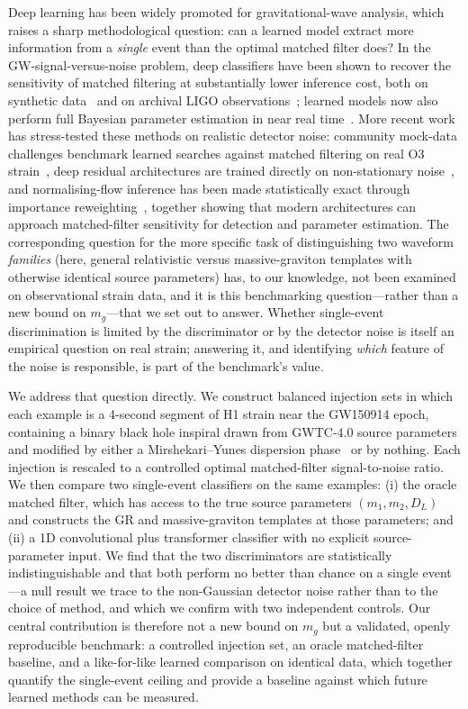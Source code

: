 \documentclass[11pt,a4paper]{article}
\newcommand{\mg}{m_{g}}
\begin{document}
Deep learning has been widely promoted for gravitational-wave analysis,
which raises a sharp methodological question: can a learned model extract
more information from a \emph{single} event than the optimal matched
filter does? In the GW-signal-versus-noise problem, deep classifiers have
been shown to recover the sensitivity of matched filtering at
substantially lower inference
cost, both on synthetic data~\cite{Gabbard2018,GeorgeHuerta2018}
and on archival LIGO observations~\cite{Cuoco2021}; learned models now
also perform full Bayesian parameter estimation in near real
time~\cite{Dax2021}. More recent work has stress-tested these methods on
realistic detector noise: community mock-data challenges benchmark learned
searches against matched filtering on real O3 strain~\cite{Schaefer2023_MLGWSC},
deep residual architectures are trained directly on non-stationary
noise~\cite{Nousi2023_ResNet}, and normalising-flow inference has been made
statistically exact through importance reweighting~\cite{Dax2023_NIS},
together showing that modern architectures can approach matched-filter
sensitivity for detection and parameter estimation. The corresponding
question for the more specific task of distinguishing two waveform
\emph{families} (here, general relativistic versus massive-graviton
templates with otherwise identical source parameters) has, to our
knowledge, not been examined on observational strain data, and it is this
benchmarking question---rather than a new bound on $\mg$---that we set
out to answer. Whether single-event discrimination is limited by the
discriminator or by the detector noise is itself an empirical question on
real strain; answering it, and identifying \emph{which} feature of the
noise is responsible, is part of the benchmark's value.

We address that question directly. We construct
balanced injection sets in which each example is a 4-second segment of
H1 strain near the GW150914 epoch, containing a binary black hole
inspiral drawn from GWTC-4.0 source parameters and modified by either a
Mirshekari--Yunes dispersion phase~\cite{MirshekariYunesWill2012} or by
nothing. Each injection is rescaled to a controlled optimal
matched-filter signal-to-noise ratio. We then compare two single-event
classifiers on the same examples: (i) the oracle matched filter, which
has access to the true source parameters $(m_{1},m_{2},D_{L})$ and
constructs the GR and massive-graviton templates at those parameters;
and (ii) a 1D convolutional plus transformer classifier with no
explicit source-parameter input. We find that the two discriminators are
statistically indistinguishable and that both perform no better than
chance on a single event---a null result we trace to the non-Gaussian
detector noise rather than to the choice of method, and which we confirm
with two independent controls. Our central contribution is therefore not
a new bound on $\mg$ but a validated, openly reproducible benchmark: a
controlled injection set, an oracle matched-filter baseline, and a
like-for-like learned comparison on identical data, which together
quantify the single-event ceiling and provide a baseline against which
future learned methods can be measured.
\end{document}
